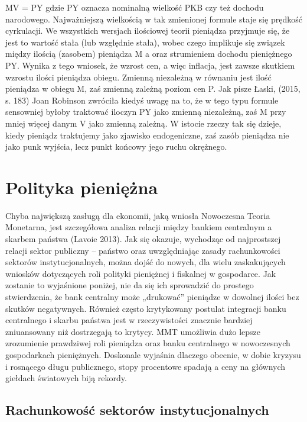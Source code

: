 \documentclass[
]{book}
\begin{document}
MV = PY
gdzie PY oznacza nominalną wielkość PKB czy też dochodu narodowego. Najważniejszą wielkością w tak zmienionej formule staje się prędkość cyrkulacji. We wszystkich wersjach ilościowej teorii pieniądza przyjmuje się, że jest to wartość stała (lub względnie stała), wobec czego implikuje się związek między ilością (zasobem) pieniądza M a oraz strumieniem dochodu pieniężnego PY. Wynika z tego wniosek, że wzrost cen, a więc inflacja, jest zawsze skutkiem wzrostu ilości pieniądza obiegu. Zmienną niezależną w równaniu jest ilość pieniądza w obiegu M, zaś zmienną zależną poziom cen P. Jak pisze Łaski, (2015, s. 183) Joan Robinson zwróciła kiedyś uwagę na to, że w tego typu formule sensowniej byłoby traktować iloczyn PY jako zmienną niezależną, zaś M przy mniej więcej danym V jako zmienną zależną. W istocie rzeczy tak się dzieje, kiedy pieniądz traktujemy jako zjawisko endogeniczne, zaś zasób pieniądza nie jako punk wyjścia, lecz punkt końcowy jego ruchu okrężnego.

\hypertarget{polityka-pieniux119ux17cna}{%
\chapter{Polityka pieniężna}\label{polityka-pieniux119ux17cna}}

Chyba największą zasługą dla ekonomii, jaką wniosła Nowoczesna Teoria Monetarna, jest szczegółowa analiza relacji między bankiem centralnym a skarbem państwa (Lavoie 2013). Jak się okazuje, wychodząc od najprostszej relacji sektor publiczny -- państwo oraz uwzględniając zasady rachunkowości sektorów instytucjonalnych, można dojść do nowych, dla wielu zaskakujących wniosków dotyczących roli polityki pieniężnej i fiskalnej w gospodarce. Jak zostanie to wyjaśnione poniżej, nie da się ich sprowadzić do prostego stwierdzenia, że bank centralny może „drukować'' pieniądze w dowolnej ilości bez skutków negatywnych. Również często krytykowany postulat integracji banku centralnego i skarbu państwa jest w rzeczywistości znacznie bardziej zniuansowany niż dostrzegają to krytycy. MMT umożliwia dużo lepsze zrozumienie prawdziwej roli pieniądza oraz banku centralnego w nowoczesnych gospodarkach pieniężnych. Doskonale wyjaśnia dlaczego obecnie, w dobie kryzysu i rosnącego długu publicznego, stopy procentowe spadają a ceny na głównych giełdach światowych biją rekordy.

\hypertarget{rachunkowoux15bux107-sektoruxf3w-instytucjonalnych}{%
\section{Rachunkowość sektorów instytucjonalnych}\label{rachunkowoux15bux107-sektoruxf3w-instytucjonalnych}}
\end{document}

